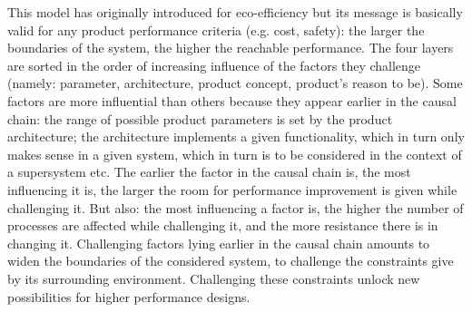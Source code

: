 \documentclass{article}
\begin{document}
This model has originally introduced for eco-efficiency \cite{brezet1997dynamics} but its message is basically valid for any product performance criteria (e.g. cost, safety): the larger the boundaries of the system, the higher the reachable performance. The four layers are sorted in the order of increasing influence of the factors they challenge (namely: parameter, architecture, product concept, product's reason to be). Some factors are more influential than others because they appear earlier in the causal chain: the range of possible product parameters is set by the product architecture; the architecture implements a given functionality, which in turn only makes sense in a given system, which in turn is to be considered in the context of a supersystem etc. The earlier the factor in the causal chain is, the most influencing it is, the larger the room for performance improvement is given while challenging it. But also: the most influencing a factor is, the higher the number of processes are affected while challenging it, and the more resistance there is in changing it. Challenging factors lying earlier in the causal chain amounts to widen the boundaries of the considered system, to challenge the constraints give by its surrounding environment. Challenging these constraints unlock new possibilities for higher performance designs.
\end{document}
